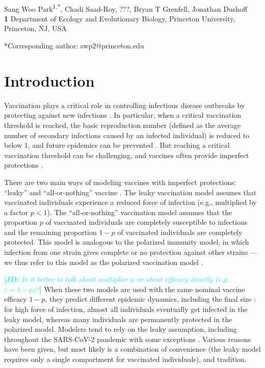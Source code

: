 \documentclass[12pt]{article}
\date{\today}
\newcommand{\comment}{\showcomment}
\newcommand{\showcomment}[3]{\textcolor{#1}{\textbf{[#2: }\textsl{#3}\textbf{]}}}
\newcommand{\jd}[1]{\comment{cyan}{JD}{#1}}
\begin{document}
\begin{flushleft}{
	\Large
	\textbf{}
}
\newline
\\
Sang Woo Park\textsuperscript{1,*}, Chadi Saad-Roy, ???, Bryan T Grenfell, Jonathan Dushoff
\\
\bigskip
\textbf{1} Department of Ecology and Evolutionary Biology, Princeton University, Princeton, NJ, USA
\\
\bigskip

*Corresponding author: swp2@princeton.edu
\end{flushleft}

\section*{Introduction}

Vaccination plays a critical role in controlling infectious disease outbreaks by protecting against new infections \citep{iwasaki2020and}.
In particular, when a critical vaccination threshold is reached, the basic reproduction number (defined as the average number of secondary infections caused by an infected individual) is reduced to below 1, and future epidemics can be prevented \citep{anderson1985vaccination}.
But reaching a critical vaccination threshold can be challenging, and vaccines often provide imperfect protections \citep{gandon2003imperfect,anderson2020challenges}.

There are two main ways of modeling vaccines with imperfect protections: ``leaky'' and ``all-or-nothing'' vaccine \citep{smith1984assessment}.
The leaky vaccination model assumes that vaccinated individuals experience a reduced force of infection (e.g., multiplied by a factor $p < 1$).
The ``all-or-nothing'' vaccination model assumes that the proportion $p$ of vaccinated individuals are completely susceptible to infections and the remaining proportion $1-p$ of vaccinated individuals are completely protected.
This model is analogous to the polarized immunity model, in which infection from one strain gives complete or no protection against other strains \citep{gog2002dynamics}---we thus refer to this model as the polarized vaccination model \citep{gomes2014missing}.

\jd{Is it better to talk about multiplier $p$ or about efficacy directly (e.g., $\varepsilon=1-p$)?}
When these two models are used with the same nominal vaccine efficacy $1-p$, they predict different epidemic dynamics, including the final size \citep{smith1984assessment}:
for high force of infection, almost all individuals eventually get infected in the leaky model, whereas many individuals are permanently protected in the polarized model.
Modelers tend to rely on the leaky assumption, including throughout the SARS-CoV-2 pandemic \citep{dyson2021possible,gozzi2021importance,marziano2021vaccine,matrajt2021vaccine,park2022intermediate} with some exceptions \citep{bubar2021model,buckner2021dynamic}.
Various reasons have been given, but most likely is a combination of convenience (the leaky model requires only a single compartment for vaccinated individuals), and tradition.
\end{document}
